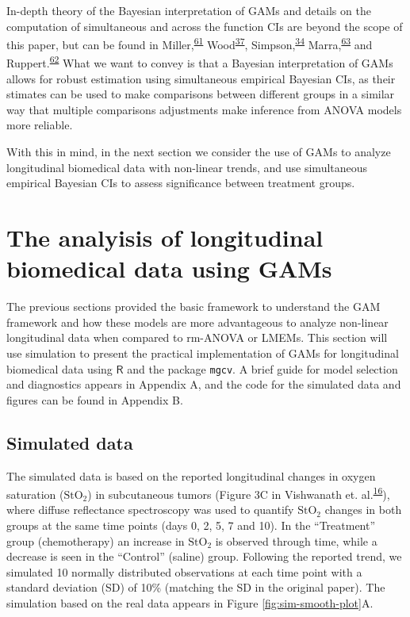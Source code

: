 \documentclass[
]{article}
\newcommand{\passthrough}[1]{#1}
\begin{document}
In-depth theory of the Bayesian interpretation of GAMs and details on the computation of simultaneous and across the function CIs are beyond the scope of this paper, but can be found in Miller,\textsuperscript{\protect\hyperlink{ref-miller2019}{61}} Wood\textsuperscript{\protect\hyperlink{ref-wood2017}{37}}, Simpson,\textsuperscript{\protect\hyperlink{ref-simpson2018}{34}} Marra,\textsuperscript{\protect\hyperlink{ref-marra2012}{63}} and Ruppert.\textsuperscript{\protect\hyperlink{ref-ruppert2003}{62}} What we want to convey is that a Bayesian interpretation of GAMs allows for robust estimation using simultaneous empirical Bayesian CIs, as their stimates can be used to make comparisons between different groups in a similar way that multiple comparisons adjustments make inference from ANOVA models more reliable.

With this in mind, in the next section we consider the use of GAMs to analyze longitudinal biomedical data with non-linear trends, and use simultaneous empirical Bayesian CIs to assess significance between treatment groups.

\hypertarget{longitudinal-GAMs}{%
\section{The analyisis of longitudinal biomedical data using GAMs}\label{longitudinal-GAMs}}

The previous sections provided the basic framework to understand the GAM framework and how these models are more advantageous to analyze non-linear longitudinal data when compared to rm-ANOVA or LMEMs. This section will use simulation to present the practical implementation of GAMs for longitudinal biomedical data using \(\textsf{R}\) and the package \passthrough{\lstinline!mgcv!}. A brief guide for model selection and diagnostics appears in Appendix A, and the code for the simulated data and figures can be found in Appendix B.

\hypertarget{simulated-data}{%
\subsection{Simulated data}\label{simulated-data}}

The simulated data is based on the reported longitudinal changes in oxygen saturation (\(\mbox{StO}_2\)) in subcutaneous tumors (Figure 3C in Vishwanath et. al.\textsuperscript{\protect\hyperlink{ref-vishwanath2009}{16}}), where diffuse reflectance spectroscopy was used to quantify \(\mbox{StO}_2\) changes in both groups at the same time points (days 0, 2, 5, 7 and 10). In the ``Treatment'' group (chemotherapy) an increase in \(\mbox{StO}_2\) is observed through time, while a decrease is seen in the ``Control'' (saline) group. Following the reported trend, we simulated 10 normally distributed observations at each time point with a standard deviation (SD) of 10\% (matching the SD in the original paper).
The simulation based on the real data appears in Figure \ref{fig:sim-smooth-plot}A.
\end{document}
